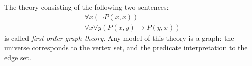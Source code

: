 \begin{exl}
\label{exl:FirstGraphTheory}
The theory consisting of the following two sentences:
\begin{gather*}
\forall x (\neg P(x,x))\\
\forall x \forall y (P(x,y) \to P(y,x))
\end{gather*}
is called \emph{first-order graph theory}.
Any model of this theory is a graph:
the universe corresponds to the vertex set, and the predicate interpretation to the edge set.

\end{exl}